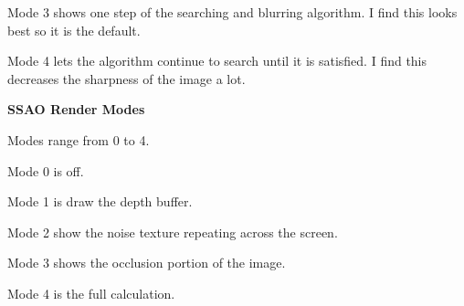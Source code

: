\documentclass[10pt]{article}
\begin{document}
	Mode 3 shows one step of the searching and blurring algorithm. I find this looks best so it is the default.
	
	Mode 4 lets the algorithm continue to search until it is satisfied. I find this decreases the sharpness of the image a lot.
	
	\begin{center}
		\bf SSAO Render Modes
	\end{center}
	
	Modes range from 0 to 4.
	
	Mode 0 is off.
	
	Mode 1 is draw the depth buffer.
	
	Mode 2 show the noise texture repeating across the screen.
	
	Mode 3 shows the occlusion portion of the image.
	
	Mode 4 is the full calculation.
\end{document}
